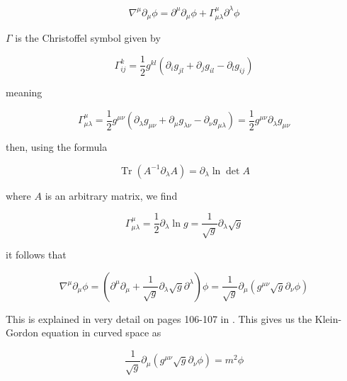\documentclass[a4paper,11pt]{article}
\numberwithin{equation}{section}
\numberwithin{figure}{section}
\begin{document}
\begin{large}
\begin{equation}
\label{covariant of vector}    
    \nabla^\mu\partial_\mu\phi=\partial^\mu \partial_\mu\phi+ \Gamma^\mu_{\mu\lambda} \partial^\lambda\phi
\end{equation}

$\Gamma$ is the Christoffel symbol given by

\begin{equation}
\label{Christoffel}
    \Gamma^k_{ij}=\frac{1}{2}g^{kl}(\partial_i g_{jl}+\partial_j g_{il}-\partial_l g_{ij})
\end{equation}

meaning 

\begin{equation}
\label{Christoffel1}    
    \Gamma^\mu_{\mu\lambda}=\frac{1}{2}g^{\mu\nu}(\partial_\lambda g_{\mu\nu}+\partial_\mu g_{\lambda\nu}-\partial_\nu g_{\mu\lambda})=\frac{1}{2} g^{\mu\nu}\partial_\lambda g_{\mu\nu}
\end{equation}

then, using the formula

\begin{equation}
\label{formula}    
    \operatorname{Tr}(A^{-1}\partial_\lambda A)=\partial_\lambda \ln \det A
\end{equation}

where $A$ is an arbitrary matrix, we find 

\begin{equation}
\label{Christoffel2}    
    \Gamma^\mu_{\mu\lambda}=\frac{1}{2} \partial_\lambda \ln g = \frac{1}{\sqrt{g}}\partial_\lambda \sqrt{g}
\end{equation}

it follows that

\begin{equation}
\label{d'Al}
    \nabla^\mu\partial_\mu\phi=(\partial^\mu\partial_\mu+\frac{1}{\sqrt{g}}\partial_\lambda \sqrt{g}\partial^\lambda)\phi=\frac{1}{\sqrt{g}}\partial_\mu (g^{\mu\nu}\sqrt{g}\partial_\nu \phi)
\end{equation}

This is explained in very detail on pages 106-107 in \cite{Weinberg}. This gives us the Klein-Gordon equation in curved space as

\begin{equation}
\label{KG}
    \frac{1}{\sqrt{g}}\partial_\mu (g^{\mu\nu}\sqrt{g}\partial_\nu \phi)=m^2\phi
\end{equation}

\newpage


\end{large}
\end{document}
